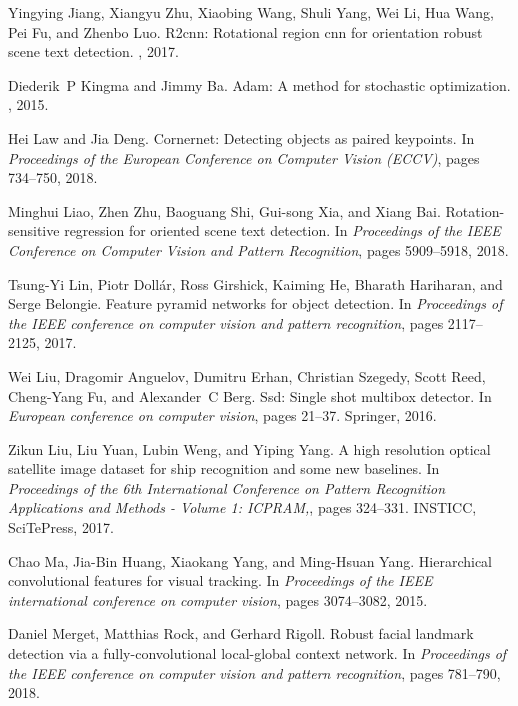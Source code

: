 \documentclass[10pt,twocolumn,letterpaper]{article}
\begin{document}
\begin{thebibliography}{10}
Yingying Jiang, Xiangyu Zhu, Xiaobing Wang, Shuli Yang, Wei Li, Hua Wang, Pei
  Fu, and Zhenbo Luo.
\newblock R2cnn: Rotational region cnn for orientation robust scene text
  detection.
, 2017.

Diederik~P Kingma and Jimmy Ba.
\newblock Adam: A method for stochastic optimization.
,
  2015.

Hei Law and Jia Deng.
\newblock Cornernet: Detecting objects as paired keypoints.
\newblock In {\em Proceedings of the European Conference on Computer Vision
  (ECCV)}, pages 734--750, 2018.

Minghui Liao, Zhen Zhu, Baoguang Shi, Gui-song Xia, and Xiang Bai.
\newblock Rotation-sensitive regression for oriented scene text detection.
\newblock In {\em Proceedings of the IEEE Conference on Computer Vision and
  Pattern Recognition}, pages 5909--5918, 2018.

Tsung-Yi Lin, Piotr Doll{\'a}r, Ross Girshick, Kaiming He, Bharath Hariharan,
  and Serge Belongie.
\newblock Feature pyramid networks for object detection.
\newblock In {\em Proceedings of the IEEE conference on computer vision and
  pattern recognition}, pages 2117--2125, 2017.

Wei Liu, Dragomir Anguelov, Dumitru Erhan, Christian Szegedy, Scott Reed,
  Cheng-Yang Fu, and Alexander~C Berg.
\newblock Ssd: Single shot multibox detector.
\newblock In {\em European conference on computer vision}, pages 21--37.
  Springer, 2016.

Zikun Liu, Liu Yuan, Lubin Weng, and Yiping Yang.
\newblock A high resolution optical satellite image dataset for ship
  recognition and some new baselines.
\newblock In {\em Proceedings of the 6th International Conference on Pattern
  Recognition Applications and Methods - Volume 1: ICPRAM,}, pages 324--331.
  INSTICC, SciTePress, 2017.

Chao Ma, Jia-Bin Huang, Xiaokang Yang, and Ming-Hsuan Yang.
\newblock Hierarchical convolutional features for visual tracking.
\newblock In {\em Proceedings of the IEEE international conference on computer
  vision}, pages 3074--3082, 2015.

Daniel Merget, Matthias Rock, and Gerhard Rigoll.
\newblock Robust facial landmark detection via a fully-convolutional
  local-global context network.
\newblock In {\em Proceedings of the IEEE conference on computer vision and
  pattern recognition}, pages 781--790, 2018.


\end{thebibliography}
\end{document}
